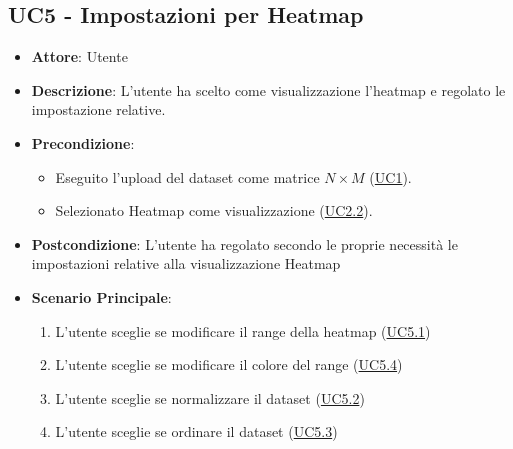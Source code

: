 \subsection{UC5 - Impostazioni per Heatmap}
    \label{uc5}
    \begin{itemize}
    \item \textbf{Attore}: Utente
    \item \textbf{Descrizione}: L'utente ha scelto come visualizzazione l'heatmap e regolato le impostazione relative.
    \item \textbf{Precondizione}: 
    \begin{itemize}
        \item Eseguito l'upload del dataset come matrice $N\times M$ (\hyperref[uc1]{UC1}).
        \item Selezionato Heatmap come visualizzazione (\hyperref[uc2.2]{UC2.2}).
    \end{itemize}  
    \item \textbf{Postcondizione}: L'utente ha regolato secondo le proprie necessità le impostazioni relative alla visualizzazione Heatmap
    \item \textbf{Scenario Principale}: 
    \begin{enumerate}
        \item L'utente sceglie se modificare il range della heatmap (\hyperref[uc5.1]{UC5.1})
        \item L'utente sceglie se modificare il colore del range (\hyperref[uc5.4]{UC5.4})
        \item L'utente sceglie se normalizzare il dataset (\hyperref[uc5.2]{UC5.2})
        \item L'utente sceglie se ordinare il dataset (\hyperref[uc5.3]{UC5.3})
    \end{enumerate}  
    \end{itemize}

